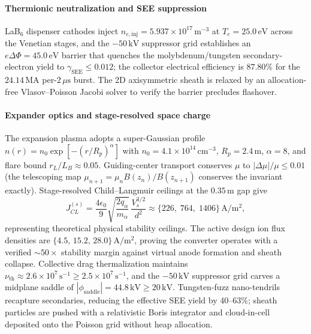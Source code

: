 \documentclass[11pt,journal,compsoc]{IEEEtran}
\begin{document}
\paragraph{Thermionic neutralization and SEE suppression}
LaB$_6$ dispenser cathodes inject $n_{e,\mathrm{inj}} = 5.937\times
10^{17}\,\mathrm{m^{-3}}$ at $T_e = 25.0\,\mathrm{eV}$ across the
Venetian stages, and the $-50\,\mathrm{kV}$ suppressor grid establishes
an $e\Delta\Phi = 45.0\,\mathrm{eV}$ barrier that quenches the
molybdenum/tungsten secondary-electron yield to $\gamma_{\mathrm{SEE}}
\le 0.012$; the collector electrical efficiency is $87.80\%$ for the
$24.14\,\mathrm{MA}$ per-$2\,\mu\mathrm{s}$ burst. The 2D
axisymmetric sheath is relaxed by an allocation-free Vlasov--Poisson
Jacobi solver to verify the barrier precludes flashover.

\paragraph{Expander optics and stage-resolved space charge}
The expansion plasma adopts a super-Gaussian profile
$n(r) = n_0\exp[-(r/R_p)^\alpha]$ with $n_0 = 4.1\times10^{14}\,
\mathrm{cm^{-3}}$, $R_p = 2.4\,\mathrm{m}$, $\alpha = 8$, and flare
bound $r_L/L_B \approx 0.05$. Guiding-center transport conserves
$\mu$ to $|\Delta\mu|/\mu \le 0.01$ (the telescoping map
$\mu_{n+1} = \mu_n B(z_n)/B(z_{n+1})$ conserves the invariant
exactly). Stage-resolved Child--Langmuir ceilings at the $0.35\,
\mathrm{m}$ gap give
\begin{equation}
J_{CL}^{(s)} = \frac{4\epsilon_0}{9}
\sqrt{\frac{2q_\alpha}{m_\alpha}}\,
\frac{V_s^{3/2}}{d^2}
\approx \{226,\;764,\;1406\}\,\mathrm{A/m^2},
\label{eq:cl4}
\end{equation}
representing theoretical physical stability ceilings. The active
design ion flux densities are $\{4.5,\,15.2,\,28.0\}\,\mathrm{A/m^2}$,
proving the converter operates with a verified $\sim 50\times$ stability
margin against virtual anode formation and sheath collapse. Collective drag
thermalization maintains $\nu_{\mathrm{th}} \approx 2.6\times10^{7}\,
\mathrm{s^{-1}} \ge 2.5\times10^{7}\,\mathrm{s^{-1}}$, and the $-50\,
\mathrm{kV}$ suppressor grid carves a midplane saddle of
$|\phi_{\mathrm{saddle}}| = 44.8\,\mathrm{kV} \ge 20\,\mathrm{kV}$.
Tungsten-fuzz nano-tendrils recapture secondaries, reducing the
effective SEE yield by $40$--$63\%$; sheath particles are pushed with
a relativistic Boris integrator and cloud-in-cell deposited onto the
Poisson grid without heap allocation.
\end{document}
